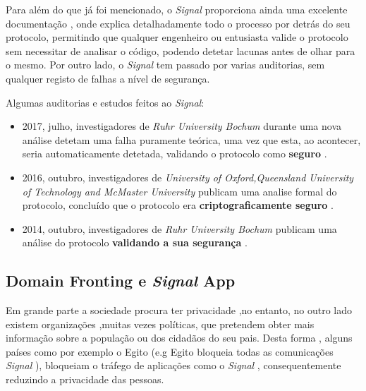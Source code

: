 Para além do que já foi mencionado, o \textit{Signal} proporciona ainda uma excelente documentação \cite{signal}, onde explica detalhadamente todo o processo por detrás do seu protocolo, permitindo que qualquer engenheiro ou entusiasta valide o protocolo sem necessitar de analisar o código, podendo detetar lacunas antes de olhar para o mesmo. Por outro lado, o \textit{Signal} tem passado por varias auditorias, sem qualquer registo de falhas a nível de segurança.

Algumas auditorias e estudos feitos ao \textit{Signal}:
\begin{itemize}
    \item 2017, julho, investigadores de \textit{Ruhr University Bochum} durante uma nova análise detetam uma falha puramente teórica, uma vez que esta, ao acontecer, seria automaticamente detetada, validando o protocolo como \textbf{seguro} \cite{rosler2018more}.
    
    \item 2016, outubro, investigadores de \textit{University of Oxford,Queensland University of Technology and McMaster University} publicam uma analise formal do protocolo, concluído que o protocolo era \textbf{criptograficamente seguro} \cite{cohn2017formal}.

    \item 2014, outubro, investigadores de \textit{Ruhr University Bochum} publicam uma análise do protocolo \textbf{validando a sua segurança} \cite{frosch2016secure}.
\end{itemize}


\subsection{Domain Fronting e \textit{Signal} App}
Em grande parte a sociedade procura ter privacidade ,no entanto, no outro lado existem organizações ,muitas vezes políticas, que pretendem obter mais informação sobre a população ou dos cidadãos do seu pais. Desta forma , alguns países como por exemplo o Egito (e.g Egito bloqueia todas as comunicações \textit{Signal} \cite{noSignal}), bloqueiam o tráfego de aplicações como o \textit{Signal} , consequentemente reduzindo a privacidade das pessoas.


